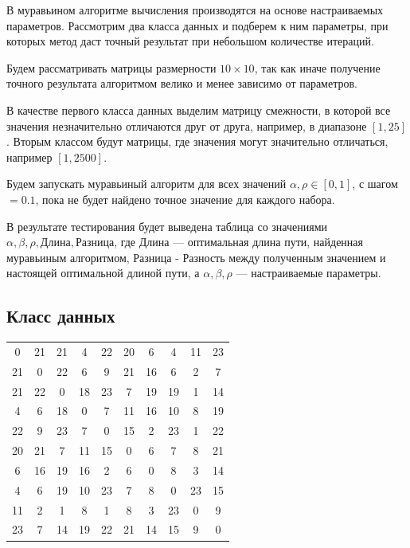 \documentclass[12pt]{report}
\begin{document}
В муравьином алгоритме вычисления производятся на основе настраиваемых параметров.
Рассмотрим два класса данных и подберем к ним параметры, при которых метод даст точный результат при небольшом количестве итераций.

Будем рассматривать матрицы размерности $10\times10$, так как иначе получение точного результата алгоритмом велико и менее зависимо от параметров.

В качестве первого класса данных выделим матрицу смежности, в которой все значения незначительно отличаются друг от друга, например, в диапазоне $[1, 25]$.
Вторым классом будут матрицы, где значения могут значительно отличаться, например $[1, 2500]$.

Будем запускать муравьиный алгоритм для всех значений $\alpha, \rho\in[0, 1]$, с шагом $= 0.1$, пока не будет найдено точное значение для каждого набора.

В результате тестирования будет выведена таблица со значениями $\alpha, \beta, \rho, Длина, Разница$, где Длина — оптимальная длина пути, найденная муравьиным алгоритмом, Разница - Разность между полученным значением и настоящей оптимальной длиной пути, а $\alpha, \beta, \rho$ — настраиваемые параметры.


\subsection{Класс данных}

\begin{tabular}{|c c c c c c c c c c|}
    \label{matrix}
  	 0 & 21 &  21 & 4 & 22 & 20 & 6 & 4 & 11 & 23 \\
        21 &     0 &    22 &     6 &     9 &    21 &    16 &     6 &     2 &     7 \\
        21 &    22 &     0 &    18 &    23 &     7 &    19 &    19 &     1 &    14 \\
        4 &     6 &    18 &     0 &     7 &    11 &    16 &    10 &     8 &    19 \\
        22 &     9 &    23 &     7 &     0 &    15 &     2 &    23 &     1 &    22 \\
        20 &    21 &     7 &    11 &    15 &     0 &     6 &     7 &     8 &    21 \\
        6 &    16 &    19 &    16 &     2 &     6 &     0 &     8 &     3 &    14 \\
        4 &     6 &    19 &    10 &    23 &     7 &     8 &     0 &    23 &    15 \\
        11 &     2 &     1 &     8 &     1 &     8 &     3 &    23 &     0 &     9 \\
        23 &     7 &    14 &    19 &    22 &    21 &    14 &    15 &     9 &     0 \\
 \end{tabular}
\end{document}
